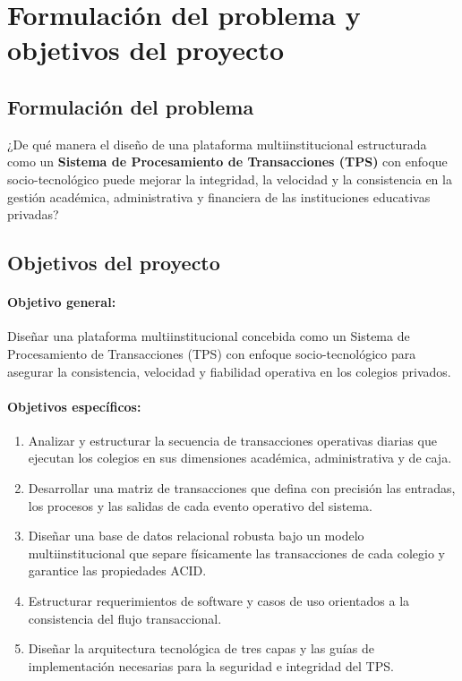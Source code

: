 \documentclass[12pt,a4paper,oneside]{report}
\begin{document}
\section{Formulación del problema y objetivos del proyecto}

\subsection{Formulación del problema}
¿De qué manera el diseño de una plataforma multiinstitucional estructurada como un \textbf{Sistema de Procesamiento de Transacciones (TPS)} con enfoque socio-tecnológico puede mejorar la integridad, la velocidad y la consistencia en la gestión académica, administrativa y financiera de las instituciones educativas privadas?

\subsection{Objetivos del proyecto}

\paragraph{Objetivo general:}
Diseñar una plataforma multiinstitucional concebida como un Sistema de Procesamiento de Transacciones (TPS) con enfoque socio-tecnológico para asegurar la consistencia, velocidad y fiabilidad operativa en los colegios privados.

\paragraph{Objetivos específicos:}
\begin{enumerate}
    \item Analizar y estructurar la secuencia de transacciones operativas diarias que ejecutan los colegios en sus dimensiones académica, administrativa y de caja.
    \item Desarrollar una matriz de transacciones que defina con precisión las entradas, los procesos y las salidas de cada evento operativo del sistema.
    \item Diseñar una base de datos relacional robusta bajo un modelo multiinstitucional que separe físicamente las transacciones de cada colegio y garantice las propiedades ACID.
    \item Estructurar requerimientos de software y casos de uso orientados a la consistencia del flujo transaccional.
    \item Diseñar la arquitectura tecnológica de tres capas y las guías de implementación necesarias para la seguridad e integridad del TPS.
\end{enumerate}
\end{document}
